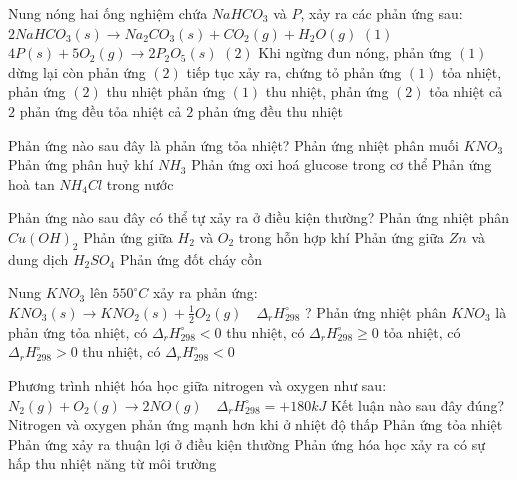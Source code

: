 \documentclass[Main.tex]{subfiles}
\begin{document}
	\begin{ex} Nung nóng hai ống nghiệm chứa $NaHCO_3$ và $P$, xảy ra các phản ứng sau:
		$2NaHCO_3(s) \longrightarrow Na_2CO_3(s) + CO_2(g) + H_2O(g)$ $(1)$
		$4P(s) + 5O_2(g) \longrightarrow 2P_2O_5(s)$ $(2)$
		Khi ngừng đun nóng, phản ứng $(1)$ dừng lại còn phản ứng $(2)$ tiếp tục xảy ra, chứng tỏ
		\choice
		{phản ứng $(1)$ tỏa nhiệt, phản ứng $(2)$ thu nhiệt}
		{\True phản ứng $(1)$ thu nhiệt, phản ứng $(2)$ tỏa nhiệt}
		{cả $2$ phản ứng đều tỏa nhiệt}
		{cả $2$ phản ứng đều thu nhiệt}
	\end{ex}
	
	\begin{ex} Phản ứng nào sau đây là phản ứng tỏa nhiệt?
		\choice
		{Phản ứng nhiệt phân muối $KNO_3$}
		{Phản ứng phân huỷ khí $NH_3$}
		{Phản ứng oxi hoá glucose trong cơ thể}
		{\True Phản ứng hoà tan $NH_4Cl$ trong nước}
	\end{ex}
	
	\begin{ex} Phản ứng nào sau đây có thể tự xảy ra ở điều kiện thường?
		\choice
		{Phản ứng nhiệt phân $Cu(OH)_2$}
		{Phản ứng giữa $H_2$ và $O_2$ trong hỗn hợp khí}
		{\True Phản ứng giữa $Zn$ và dung dịch $H_2SO_4$}
		{Phản ứng đốt cháy cồn}
	\end{ex}
	
	\begin{ex} Nung $KNO_3$ lên $550^{\circ}C$ xảy ra phản ứng:
		$KNO_3(s) \longrightarrow KNO_2(s) + \frac{1}{2}O_2(g) \quad \Delta_r H_{298}^{\circ}$ ?
		Phản ứng nhiệt phân $KNO_3$ là phản ứng
		\choice
		{tỏa nhiệt, có $\Delta_r H_{298}^{\circ} < 0$}
		{thu nhiệt, có $\Delta_r H_{298}^{\circ} \geq 0$}
		{tỏa nhiệt, có $\Delta_r H_{298}^{\circ} > 0$}
		{\True thu nhiệt, có $\Delta_r H_{298}^{\circ} < 0$}
	\end{ex}
	\begin{ex}
		 Phương trình nhiệt hóa học giữa nitrogen và oxygen như sau:
		$N_2(g) + O_2(g) \longrightarrow 2NO(g) \quad \Delta_r H_{298}^{\circ} = +180 kJ$
		Kết luận nào sau đây đúng?
		\choice
		{Nitrogen và oxygen phản ứng mạnh hơn khi ở nhiệt độ thấp}
		{Phản ứng tỏa nhiệt}
		{Phản ứng xảy ra thuận lợi ở điều kiện thường}
		{\True Phản ứng hóa học xảy ra có sự hấp thu nhiệt năng từ môi trường}
	\end{ex}
	
\end{document}
